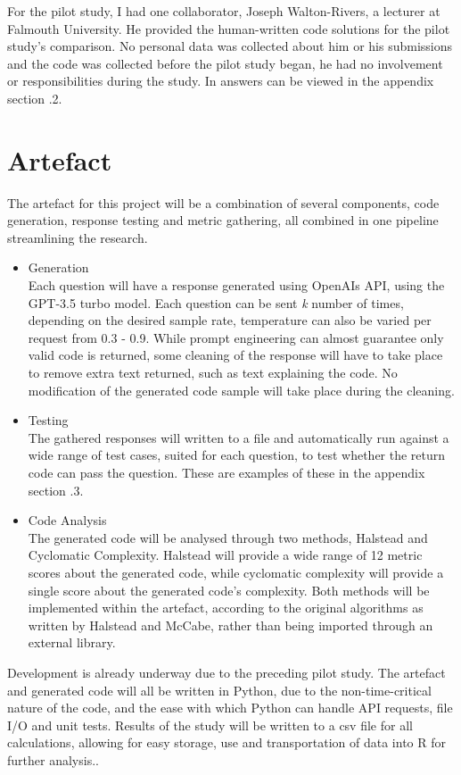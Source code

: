 \documentclass[manuscript,screen,review,sigconf]{acmart}
\begin{document}
For the pilot study, I had one collaborator, Joseph Walton-Rivers, a lecturer at Falmouth University. He provided the human-written code solutions for the pilot study's comparison. No personal data was collected about him or his submissions and the code was collected before the pilot study began, he had no involvement or responsibilities during the study. In answers can be viewed in the appendix section .2. %

\section{Artefact}
The artefact for this project will be a combination of several components, code generation, response testing and metric gathering, all combined in one pipeline streamlining the research.
\begin{itemize}
    \item Generation\\
    Each question will have a response generated using OpenAIs API, using the GPT-3.5 turbo model. Each question can be sent \textit{k} number of times, depending on the desired sample rate, temperature can also be varied per request from 0.3 - 0.9. While prompt engineering can almost guarantee only valid code is returned, some cleaning of the response will have to take place to remove extra text returned, such as text explaining the code. No modification of the generated code sample will take place during the cleaning.
    \item Testing\\
    The gathered responses will written to a file and automatically run against a wide range of test cases, suited for each question, to test whether the return code can pass the question. These are examples of these in the appendix section .3.
    \item Code Analysis\\
    The generated code will be analysed through two methods, Halstead and Cyclomatic Complexity. Halstead will provide a wide range of 12 metric scores about the generated code, while cyclomatic complexity will provide a single score about the generated code's complexity. Both methods will be implemented within the artefact, according to the original algorithms as written by Halstead and McCabe, rather than being imported through an external library.
\end{itemize}

Development is already underway due to the preceding pilot study. The artefact and generated code will all be written in Python, due to the non-time-critical nature of the code, and the ease with which Python can handle API requests, file I/O and unit tests. Results of the study will be written to a csv file for all calculations, allowing for easy storage, use and transportation of data into R for further analysis..
\end{document}
